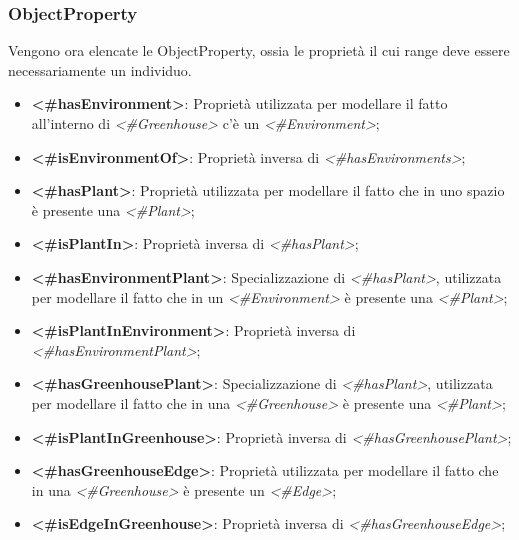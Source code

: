 \newcommand\boldYellow[1]{\textcolor{yellow(munsell)}{\textbf{#1}}}

\subsubsection{ObjectProperty}
Vengono ora elencate le ObjectProperty, ossia le proprietà il cui range deve essere necessariamente un individuo.
\begin{itemize}
	\item \textbf{<\#hasEnvironment>}: Proprietà utilizzata per modellare il fatto all'interno di \textit{<\#Greenhouse>} c'è un \textit{<\#Environment>};

	\item \boldYellow{<\#isEnvironmentOf>}: Proprietà inversa di \textit{<\#hasEnvironments>};

	\item \textbf{<\#hasPlant>}: Proprietà utilizzata per modellare il fatto che in uno spazio è presente una  \textit{<\#Plant>};

	\item \boldYellow{<\#isPlantIn>}: Proprietà inversa di \textit{<\#hasPlant>};

	\item \textbf{<\#hasEnvironmentPlant>}: Specializzazione di \textit{<\#hasPlant>}, utilizzata per modellare il fatto che in un \textit{<\#Environment>} è presente una  \textit{<\#Plant>};

	\item \boldYellow{<\#isPlantInEnvironment>}: Proprietà inversa di \textit{<\#hasEnvironmentPlant>};

	\item \textbf{<\#hasGreenhousePlant>}: Specializzazione di \textit{<\#hasPlant>}, utilizzata per modellare il fatto che in una \textit{<\#Greenhouse>} è presente una  \textit{<\#Plant>};

	\item \boldYellow{<\#isPlantInGreenhouse>}: Proprietà inversa di \textit{<\#hasGreenhousePlant>};

	\item \textbf{<\#hasGreenhouseEdge>}: Proprietà utilizzata per modellare il fatto che in una \textit{<\#Greenhouse>} è presente un \textit{<\#Edge>};

	\item \boldYellow{<\#isEdgeInGreenhouse>}: Proprietà inversa di \textit{<\#hasGreenhouseEdge>};


\end{itemize}
